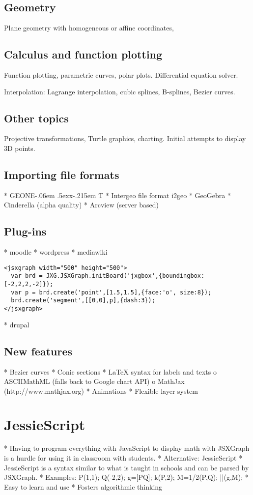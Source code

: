 \documentclass[12pt,a4paper]{article}%
\def\GEONExT{GEONE\kern-.06em \lower.5ex\hbox{x}\kern-.215em T}
\begin{document}
\subsection{Geometry}
Plane geometry with 
homogeneous or affine coordinates,



\subsection{Calculus and function plotting}
Function plotting, parametric curves, polar plots. 
Differential equation solver.

Interpolation: Lagrange interpolation, 
cubic splines, B-splines, Bezier curves.



\subsection{Other topics}
Projective transformations,
Turtle graphics, 
charting.
Initial attempts to display 3D points.



\subsection{Importing file formats}
    * \GEONExT{}
    * Intergeo file format i2geo
    * GeoGebra
    * Cinderella (alpha quality)
    * Arcview (server based) 
\subsection{Plug-ins}
    * moodle
    * wordpress
    * mediawiki
\begin{verbatim}
<jsxgraph width="500" height="500">
  var brd = JXG.JSXGraph.initBoard('jxgbox',{boundingbox:[-2,2,2,-2]});
  var p = brd.create('point',[1.5,1.5],{face:'o', size:8});
  brd.create('segment',[[0,0],p],{dash:3});
</jsxgraph>
\end{verbatim}                    
    * drupal 

\subsection{New features}
    * Bezier curves
    * Conic sections
    * \LaTeX{} syntax for labels and texts
          o ASCIIMathML (falls back to Google chart API)
          o MathJax (http://www.mathjax.org)
    * Animations
    * Flexible layer system 

\section{JessieScript}
    * Having to program everything with JavaScript to display math with JSXGraph is a hurdle for using it in classroom with students.
    * Alternative: JessieScript
    * JessieScript is a syntax similar to what is taught in schools and can be parsed by JSXGraph.
    * Examples: P(1,1); Q(-2,2); g=[PQ]; k(P,2); M=1/2(P,Q); ||(g,M);
    * Easy to learn and use
    * Fosters algorithmic thinking 
\end{document}
